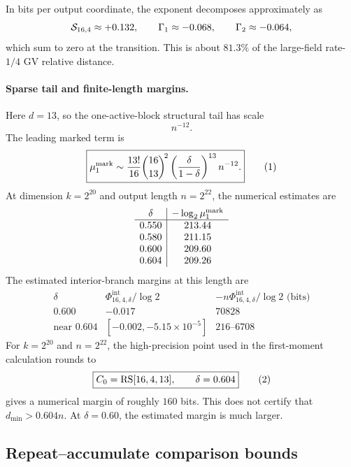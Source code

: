 In bits per output coordinate, the exponent decomposes approximately as
\[
    \mathcal S_{16,4}\approx+0.132,
    \qquad
    \Gamma_1\approx-0.068,
    \qquad
    \Gamma_2\approx-0.064,
\]
which sum to zero at the transition.  This is about $81.3\%$ of the
large-field rate-$1/4$ GV relative distance.

\paragraph{Sparse tail and finite-length margins.}

Here $d=13$, so the one-active-block structural tail has scale
\[
    \boxed{n^{-12}.}
\]
The leading marked term is
\[
    \boxed{
    \mu_1^{\rm mark}
      \sim
    \frac{13!}{16}
    \binom{16}{13}^{\!2}
    \left(\frac{\delta}{1-\delta}\right)^{13}
    n^{-12}.
    }
    \eqnumlabel{eq:R6}
\]
At dimension $k=2^{20}$ and output length $n=2^{22}$, the numerical estimates
are
\[
\begin{array}{c|c}
\delta & -\log_2\mu_1^{\rm mark}\\
\hline
0.550 & 213.44\\
0.580 & 211.15\\
0.600 & 209.60\\
0.604 & 209.26
\end{array}
\]
The estimated interior-branch margins at this length are
\[
\begin{array}{c|c|c}
\delta
& \Phi^{\mathrm{int}}_{16,4,\delta}/\log 2
& -n\Phi^{\mathrm{int}}_{16,4,\delta}/\log 2\text{ (bits)}\\
\hline
0.600 & -0.017 & 70828\\
\text{near }0.604 &
[-0.002,-5.15\mathbin{\times}10^{-5}] & 216\text{--}6708
\end{array}
\]
For $k=2^{20}$ and $n=2^{22}$, the high-precision point used in the
first-moment calculation rounds to
\[
    \boxed{
    C_0=\operatorname{RS}[16,4,13],
    \qquad
    \delta=0.604
    }
    \eqnumlabel{eq:R7}
\]
gives a numerical margin of roughly $160$ bits.  This does not certify that
$d_{\min}>0.604n$.  At $\delta=0.60$, the estimated margin is much larger.




\subsection{Repeat--accumulate comparison bounds}
\label{app:ra-bound}

